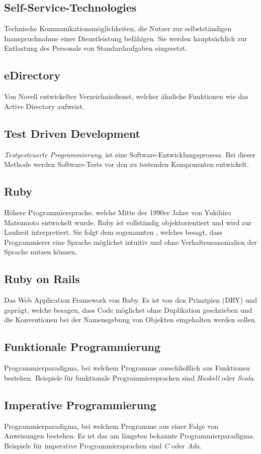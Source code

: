 \subsection*{Self-Service-Technologies}
Technische Kommunikationsmöglichkeiten, die Nutzer zur selbstständigen Inanspruchnahme einer
Dienstleistung befähigen. Sie werden hauptsächlich zur Entlastung des Personals von
Standardaufgaben eingesetzt.
\subsection*{eDirectory}
Von Novell entwickelter Verzeichnisdienst, welcher ähnliche Funktionen wie das Active Directory
aufweist.
\subsection*{Test Driven Development}
\emph{Testgesteuerte Programmierung}, ist eine Software-Entwicklungsprozess. Bei dieser Methode werden
Software-Tests vor den zu testenden Komponenten entwickelt.
\subsection*{Ruby}
Höhere Programmiersprache, welche Mitte der 1990er Jahre von Yukihiro Matsumoto entwickelt wurde. Ruby
ist vollständig objektorientiert und wird zur Laufzeit interpretiert. Sie folgt dem sogenannten
, welches besagt, dass Programmierer eine Sprache möglichst
intuitiv und ohne Verhaltensanomalien der Sprache nutzen können.
\subsection*{Ruby on Rails}
Das Web Application Framework von Ruby. Es ist von den Prinzipien  (DRY) und
 geprägt, welche besagen, dass Code möglichst ohne Duplikation
geschrieben und die Konventionen bei der Namensgebung von Objekten eingehalten werden sollen.
\subsection*{Funktionale Programmierung}
Programmierparadigma, bei welchem Programme ausschließlich aus Funktionen bestehen. Beispiele für
funktionale Programmiersprachen sind \textit{Haskell} oder \textit{Scala}.
\subsection*{Imperative Programmierung}
Programmierparadigma, bei welchem Programme aus einer Folge von Anweisungen bestehen. Es ist das
am längsten bekannte Programmierparadigma. Beispiele für imperative Programmiersprachen sind
\textit{C} oder \textit{Ada}.
